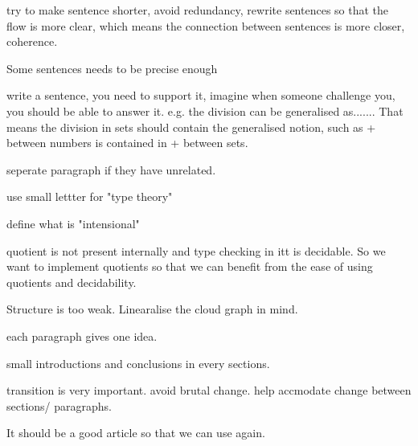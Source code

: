 try to make sentence shorter, avoid redundancy, rewrite sentences so that the flow is more clear, which means the connection between sentences is more closer, coherence.
 
Some sentences needs to be precise enough

write a sentence, you need to support it, imagine when someone challenge you, you should be able to answer it.
e.g. the division can be generalised as....... That means the division in sets should contain the generalised notion, such as + between numbers is contained in + between sets.

seperate paragraph if they have unrelated.

use small lettter for "type theory"

define what is "intensional"

quotient is not present internally and type checking in itt is decidable. So we want to implement quotients so that we can benefit from the ease of using quotients and decidability.

Structure is too weak. Linearalise the cloud graph in mind.

each paragraph gives one idea.

small introductions and conclusions in every sections.

transition is very important. avoid brutal change. help accmodate change between sections/ paragraphs.

It should be a good article so that we can use again.
